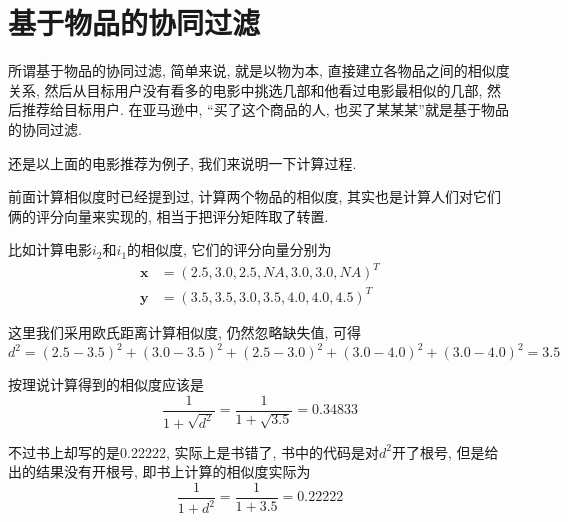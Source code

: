 \documentclass[a4paper,UTF8]{ctexart}
\theoremstyle{plain} \newtheorem{theorem}{定理}[section]
\theoremstyle{plain} \newtheorem{definition}{定义}[section]
\theoremstyle{plain} \newtheorem{lemma}{引理}[section]
\theoremstyle{plain} \newtheorem{proposition}{命题}[section]
\theoremstyle{plain} \newtheorem{example}{例}[section]
\theoremstyle{plain} \newtheorem{remark}{注}[section]
\theoremstyle{plain} \newtheorem{corollary}{推论}[section]
\begin{document}
\section{基于物品的协同过滤}
所谓基于物品的协同过滤, 简单来说, 就是以物为本, 直接建立各物品之间的相似度关系, 然后从目标用户没有看多的电影中挑选几部和他看过电影最相似的几部, 然后推荐给目标用户. 在亚马逊中, “买了这个商品的人, 也买了某某某”就是基于物品的协同过滤.

还是以上面的电影推荐为例子, 我们来说明一下计算过程.

前面计算相似度时已经提到过, 计算两个物品的相似度, 其实也是计算人们对它们俩的评分向量来实现的, 相当于把评分矩阵取了转置.

比如计算电影$i_2$和$i_1$的相似度, 它们的评分向量分别为
\begin{align*}
\bm{x} & = (2.5, 3.0, 2.5, NA, 3.0, 3.0, NA)^{T} \\ 
\bm{y} & = (3.5, 3.5, 3.0, 3.5, 4.0, 4.0, 4.5)^{T}
\end{align*}

这里我们采用欧氏距离计算相似度, 仍然忽略缺失值, 可得
\begin{equation*}
d^{2} = (2.5 - 3.5)^2 + (3.0 - 3.5)^2 + (2.5 - 3.0)^2 + (3.0 - 4.0)^2 + (3.0 - 4.0)^2 = 3.5
\end{equation*}

按理说计算得到的相似度应该是
\begin{equation*}
\frac{1}{1 + \sqrt{d^2}} = \frac{1}{1 + \sqrt{3.5}} = 0.34833
\end{equation*}

不过书上却写的是0.22222, 实际上是书错了, 书中的代码是对$d^2$开了根号, 但是给出的结果没有开根号, 即书上计算的相似度实际为
\begin{equation*}
\frac{1}{1 + d^2} = \frac{1}{1 + 3.5} = 0.22222
\end{equation*}
\end{document}
